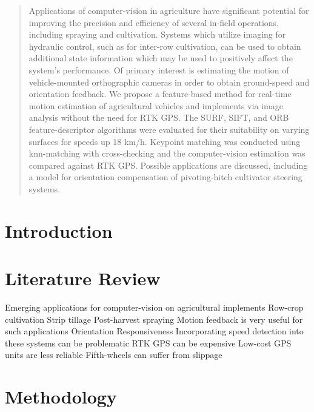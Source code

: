 \begin{abstract}
Applications of computer-vision in agriculture have significant
potential for improving the precision and efficiency of several
in-field operations, including spraying and cultivation.
Systems which utilize imaging for hydraulic
control, such as for inter-row cultivation, can be used to obtain
additional state information which may be used to positively affect the system's
performance. Of primary interest is estimating the
motion of vehicle-mounted orthographic cameras in order to obtain
ground-speed and orientation feedback. We propose a feature-based
method for real-time motion estimation of agricultural vehicles and
implements via image analysis without the need for RTK GPS. The SURF,
SIFT, and ORB feature-descriptor algorithms were evaluated for their
suitability on varying surfaces for speeds up 18 km/h. Keypoint
matching was conducted using knn-matching with cross-checking and the
computer-vision estimation was compared against RTK
GPS. Possible applications are discussed, including a model for
orientation compensation of pivoting-hitch cultivator steering systems.
\end{abstract}

\section{Introduction}
\lipsum[1]

\section{Literature Review}
Emerging applications for computer-vision on agricultural implements
Row-crop cultivation
Strip tillage
Post-harvest spraying
Motion feedback is very useful for such applications
Orientation
Responsiveness
Incorporating speed detection into these systems can be problematic
RTK GPS can be expensive
Low-cost GPS units are less reliable
Fifth-wheels can suffer from slippage

\section{Methodology}

